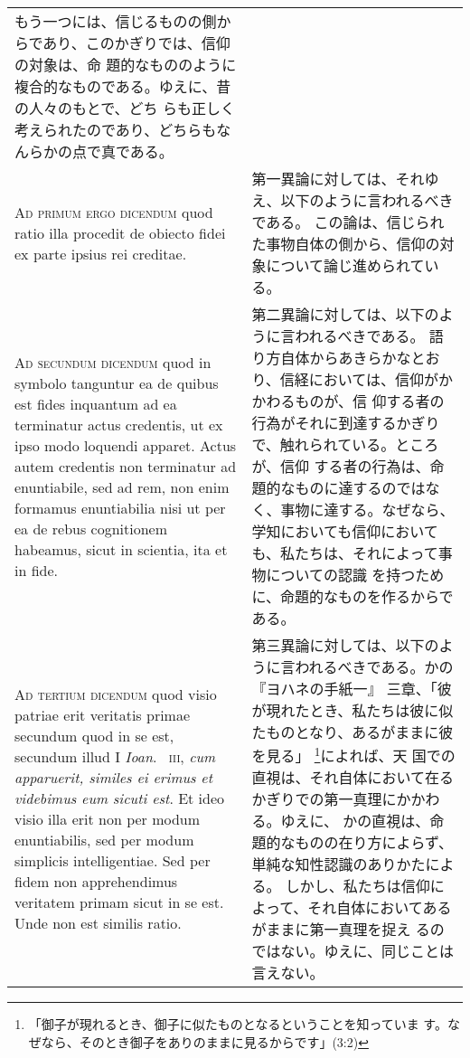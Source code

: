 \documentclass[10pt]{jsarticle} %
\begin{document}
\begin{longtable}{p{21em}p{21em}}
もう一つには、信じるものの側からであり、このかぎりでは、信仰の対象は、命
 題的なもののように複合的なものである。ゆえに、昔の人々のもとで、どち
 らも正しく考えられたのであり、どちらもなんらかの点で真である。

\\


{\scshape Ad primum ergo dicendum} quod ratio illa
procedit de obiecto fidei ex parte ipsius rei creditae.

&

第一異論に対しては、それゆえ、以下のように言われるべきである。
この論は、信じられた事物自体の側から、信仰の対象について論じ進められてい
 る。

\\


{\scshape Ad secundum dicendum} quod in symbolo
tanguntur ea de quibus est fides inquantum ad ea terminatur actus
credentis, ut ex ipso modo loquendi apparet. Actus autem credentis non
terminatur ad enuntiabile, sed ad rem, non enim formamus enuntiabilia
nisi ut per ea de rebus cognitionem habeamus, sicut in scientia, ita et
in fide.

&

第二異論に対しては、以下のように言われるべきである。
語り方自体からあきらかなとおり、信経においては、信仰がかかわるものが、信
 仰する者の行為がそれに到達するかぎりで、触れられている。ところが、信仰
 する者の行為は、命題的なものに達するのではなく、事物に達する。なぜなら、
 学知においても信仰においても、私たちは、それによって事物についての認識
 を持つために、命題的なものを作るからである。


\\


{\scshape Ad tertium dicendum} quod visio patriae erit veritatis primae
secundum quod in se est, secundum illud I {\itshape Ioan}.~{\scshape
iii}, {\itshape cum apparuerit, similes ei erimus et videbimus eum
sicuti est}. Et ideo visio illa erit non per modum enuntiabilis, sed per
modum simplicis intelligentiae. Sed per fidem non apprehendimus
veritatem primam sicut in se est. Unde non est similis ratio.

&

第三異論に対しては、以下のように言われるべきである。かの『ヨハネの手紙一』
三章、「彼が現れたとき、私たちは彼に似たものとなり、あるがままに彼を見る」
\footnote{「御子が現れるとき、御子に似たものとなるということを知っていま
す。なぜなら、そのとき御子をありのままに見るからです」(3:2)}によれば、天
国での直視は、それ自体において在るかぎりでの第一真理にかかわる。ゆえに、
かの直視は、命題的なものの在り方によらず、単純な知性認識のありかたによる。
しかし、私たちは信仰によって、それ自体においてあるがままに第一真理を捉え
るのではない。ゆえに、同じことは言えない。




\end{longtable}
\newpage
\end{document}
